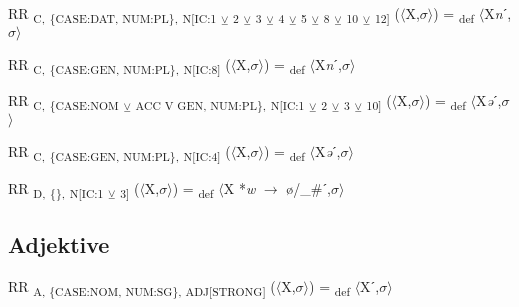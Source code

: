 {\begin{exe}
 RR \textsubscript{C,} \textsubscript{\{CASE:DAT, NUM:PL\},} \textsubscript{N[IC:1} \textsubscript{${\veebar}$}\textsubscript{ 2} \textsubscript{${\veebar}$}\textsubscript{ 3} \textsubscript{${\veebar}$}\textsubscript{ 4} \textsubscript{${\veebar}$}\textsubscript{ 5} \textsubscript{${\veebar}$}\textsubscript{ 8} \textsubscript{${\veebar}$}\textsubscript{ 10} \textsubscript{${\veebar}$}\textsubscript{ 12]} ($\langle$X,$\sigma $$\rangle$) = \textsubscript{def} $\langle$X\textit{n}ˊ,$\sigma $$\rangle$
\end{exe}

\begin{exe}
 RR \textsubscript{C,} \textsubscript{\{CASE:GEN, NUM:PL\},} \textsubscript{N[IC:8]} ($\langle$X,$\sigma $$\rangle$) = \textsubscript{def} $\langle$X\textit{n}ˊ,$\sigma $$\rangle$
\end{exe}

\begin{exe}
 RR \textsubscript{C,} \textsubscript{\{CASE:NOM} \textsubscript{${\veebar}$}\textsubscript{ ACC V GEN, NUM:PL\},} \textsubscript{N[IC:1} \textsubscript{${\veebar}$}\textsubscript{ 2} \textsubscript{${\veebar}$}\textsubscript{ 3} \textsubscript{${\veebar}$}\textsubscript{ 10]} ($\langle$X,$\sigma $$\rangle$) = \textsubscript{def} $\langle$X\textit{ə}ˊ,$\sigma $$\rangle$
\end{exe}

\begin{exe}
 RR \textsubscript{C,} \textsubscript{\{CASE:GEN, NUM:PL\},} \textsubscript{N[IC:4]} ($\langle$X,$\sigma $$\rangle$) = \textsubscript{def} $\langle$X\textit{ə}ˊ,$\sigma $$\rangle$
\end{exe}

\begin{exe}
 RR \textsubscript{D,} \textsubscript{\{\},} \textsubscript{N[IC:1} \textsubscript{${\veebar}$}\textsubscript{ 3]} ($\langle$X,$\sigma $$\rangle$) = \textsubscript{def} $\langle$X *\textit{w} $\rightarrow$ ø/\_\#ˊ,$\sigma $$\rangle$
\end{exe}

\subsection{Adjektive}

\begin{exe}
 RR \textsubscript{A, \{CASE:NOM, NUM:SG\}, ADJ[STRONG]} ($\langle$X,$\sigma $$\rangle$) = \textsubscript{def} $\langle$Xˊ,$\sigma $$\rangle$
\end{exe}

}
